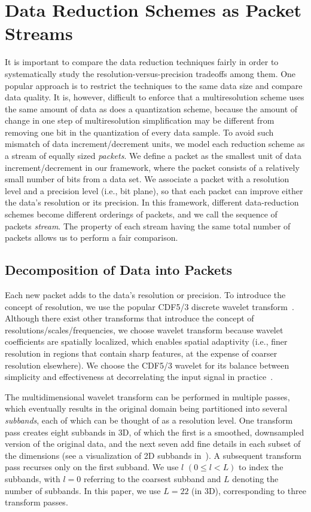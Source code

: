 \section{Data Reduction Schemes as Packet Streams} \label{sec:terminologies}

It is important to compare the data reduction techniques fairly in order to systematically study the
resolution-versus-precision tradeoffs among them. One popular approach is to restrict the techniques
to the same data size and compare data quality. It is, however, difficult to enforce that a
multiresolution scheme uses the same amount of data as does a quantization scheme, because the
amount of change in one step of multiresolution simplification may be different from removing one
bit in the quantization of every data sample. To avoid such mismatch of data increment/decrement
units, we model each reduction scheme as a stream of equally sized \emph{packets}. We define a
packet as the smallest unit of data increment/decrement in our framework, where the packet consists
of a relatively small number of bits from a data set. We associate a packet with a resolution level
and a precision level (i.e., bit plane), so that each packet can improve either the data's
resolution or its precision. In this framework, different data-reduction schemes become different
orderings of packets, and we call the sequence of packets \emph{stream}. The property of each stream
having the same total number of packets allows us to perform a fair comparison.

\subsection{Decomposition of Data into Packets} \label{sec:data-streaming-framework}

Each new packet adds to the data's resolution or precision. To introduce the concept of resolution,
we use the popular CDF5/3 discrete wavelet transform~\cite{cdf-wavelets}. Although there exist other
transforms that introduce the concept of resolutions/scales/frequencies, we choose wavelet transform
because wavelet coefficients are spatially localized, which enables spatial adaptivity (i.e., finer
resolution in regions that contain sharp features, at the expense of coarser resolution elsewhere).
We choose the CDF5/3 wavelet for its balance between simplicity and effectiveness at decorrelating
the input signal in practice~\cite{jpeg2000}.

The multidimensional wavelet transform can be performed in multiple passes, which eventually results
in the original domain being partitioned into several \emph{subbands}, each of which can be thought
of as a resolution level. One transform pass creates eight subbands in 3D, of which the first is a
smoothed, downsampled version of the original data, and the next seven add fine details in each
subset of the dimensions (see a visualization of 2D subbands in~). A subsequent
transform pass recurses only on the first subband. We use $l$ $(0 \leq l < L)$ to index the
subbands, with $l = 0$ referring to the coarsest subband and $L$ denoting the number of subbands. In
this paper, we use $L=22$ (in 3D), corresponding to three transform passes.

